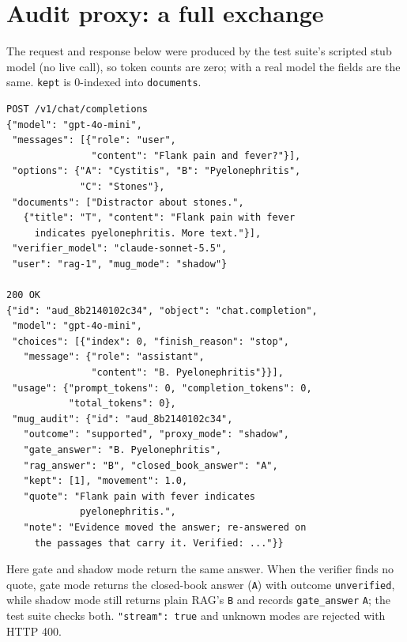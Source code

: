 \documentclass[11pt]{article}
\begin{document}
\appendix

\section{Audit proxy: a full exchange}
\label{app:proxy}
The request and response below were produced by the test suite's scripted stub
model (no live call), so token counts are zero; with a real model the fields
are the same. \texttt{kept} is 0-indexed into \texttt{documents}.
{\scriptsize
\begin{verbatim}
POST /v1/chat/completions
{"model": "gpt-4o-mini",
 "messages": [{"role": "user",
               "content": "Flank pain and fever?"}],
 "options": {"A": "Cystitis", "B": "Pyelonephritis",
             "C": "Stones"},
 "documents": ["Distractor about stones.",
   {"title": "T", "content": "Flank pain with fever
     indicates pyelonephritis. More text."}],
 "verifier_model": "claude-sonnet-5.5",
 "user": "rag-1", "mug_mode": "shadow"}

200 OK
{"id": "aud_8b2140102c34", "object": "chat.completion",
 "model": "gpt-4o-mini",
 "choices": [{"index": 0, "finish_reason": "stop",
   "message": {"role": "assistant",
               "content": "B. Pyelonephritis"}}],
 "usage": {"prompt_tokens": 0, "completion_tokens": 0,
           "total_tokens": 0},
 "mug_audit": {"id": "aud_8b2140102c34",
   "outcome": "supported", "proxy_mode": "shadow",
   "gate_answer": "B. Pyelonephritis",
   "rag_answer": "B", "closed_book_answer": "A",
   "kept": [1], "movement": 1.0,
   "quote": "Flank pain with fever indicates
             pyelonephritis.",
   "note": "Evidence moved the answer; re-answered on
     the passages that carry it. Verified: ..."}}
\end{verbatim}}
\noindent Here gate and shadow mode return the same answer. When the verifier
finds no quote, gate mode returns the closed-book answer (\texttt{A}) with
outcome \texttt{unverified}, while shadow mode still returns plain RAG's
\texttt{B} and records \texttt{gate\_answer} \texttt{A}; the test suite checks
both. \texttt{"stream": true} and unknown modes are rejected with HTTP 400.
\end{document}
